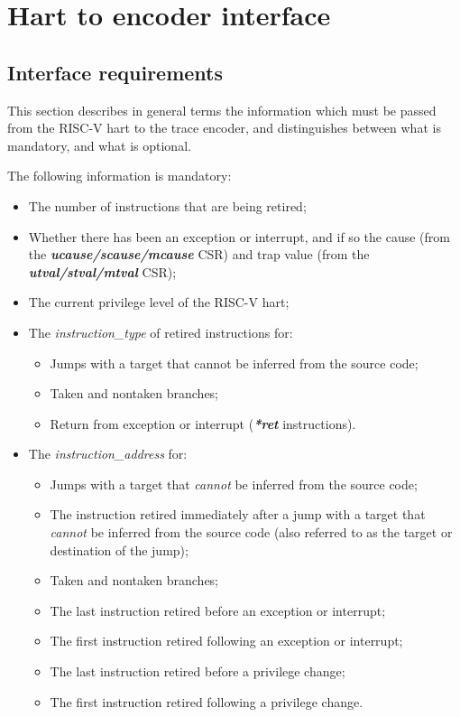 \chapter{Hart to encoder interface} \label{Interface}

\section{Interface requirements}
This section describes in general terms the information which must be passed from the RISC-V hart to the trace encoder,
and distinguishes between what is mandatory, and what is optional.

The following information is mandatory:

\begin{itemize}
  \item The number of instructions that are being retired;
  \item Whether there has been an exception or interrupt, and if so the cause (from the \textbf{\textit{ucause/scause/mcause}} CSR)
        and trap value (from the \textbf{\textit{utval/stval/mtval}} CSR);
  \item The current privilege level of the RISC-V hart;
  \item The \textit{instruction\_type} of retired instructions for:
    \begin{itemize}
      \item Jumps with a target that cannot be inferred from the source code;
      \item Taken and nontaken branches;
      \item Return from exception or interrupt (\textbf{\textit{*ret}} instructions).
    \end{itemize}
  \item The \textit{instruction\_address} for:
    \begin{itemize}
      \item Jumps with a target that \textit{cannot} be inferred from the source code;
      \item The instruction retired immediately after a jump with a target that \textit{cannot} be inferred 
        from the source code (also referred to as the target or destination of the jump);
      \item Taken and nontaken branches;
      \item The last instruction retired before an exception or interrupt;
      \item The first instruction retired following an exception or interrupt;
      \item The last instruction retired before a privilege change;
      \item The first instruction retired following a privilege change.
    \end{itemize}
\end{itemize}

